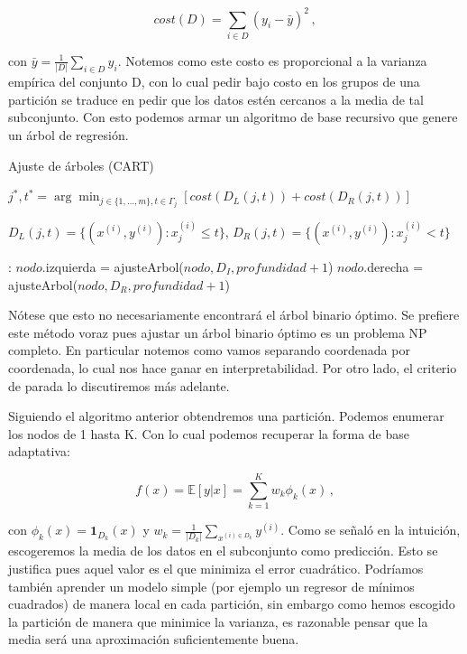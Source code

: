 \begin{equation}
    cost(D) = \sum_{i \in D} (y_i - \bar y)^2 \,,
\end{equation}

con $\bar y = \frac{1}{|D|} \sum_{i \in D} y_i $. Notemos como este costo es proporcional a la varianza empírica del conjunto D, con lo cual pedir bajo costo en los grupos de una partición se traduce en pedir que los datos estén cercanos a la media de tal subconjunto. Con esto podemos armar un algoritmo de base recursivo que genere un árbol de regresión.


\begin{algorithm}[H]
  \caption{Ajuste de árboles (CART)
    \label{alg:CART}}
  \begin{algorithmic}[1]
      \State $j^*, t^* = \arg\min_{j \in \{1,\dots,m\}, t \in \Gamma_j} \left[ cost(D_L(j,t)) + cost(D_R(j,t)) \right]$

        $D_L(j,t) = \{(x^{(i)}, y^{(i)}) : x_j^{(i)} \leq t \}$, $D_R(j,t) = \{(x^{(i)}, y^{(i)}) : x_j^{(i)} < t \}$
      
      :
      \Else
        \State $nodo$.izquierda = ajusteArbol($nodo, D_I, profundidad + 1$)
        \State $nodo$.derecha = ajusteArbol($nodo, D_R, profundidad + 1$)
    \EndFunction
  \end{algorithmic}
\end{algorithm}

Nótese que esto no necesariamente encontrará el árbol binario óptimo. Se prefiere este método voraz pues ajustar un árbol binario óptimo es un problema NP completo. En particular notemos como vamos separando coordenada por coordenada, lo cual nos hace ganar en interpretabilidad. Por otro lado, el 
 criterio de parada lo discutiremos más adelante.

Siguiendo el algoritmo anterior obtendremos una partición. Podemos enumerar los nodos de 1 hasta K. Con lo cual podemos recuperar la forma de base adaptativa:

\begin{equation}
    f(x) = \mathbb{E}[y | x] = \sum^K_{k=1} w_k \phi_k(x) \,,
\end{equation}

con $\phi_k(x) = \mathbf{1}_{D_k}(x)$ y $w_k = \frac{1}{|D_k|} \sum_{x^{(i) \in D_k}} y^{(i)}$. Como se señaló en la intuición, escogeremos la media de los datos en el subconjunto como predicción. Esto se justifica pues aquel valor es el que minimiza el error cuadrático. Podríamos también aprender un modelo simple (por ejemplo un regresor de mínimos cuadrados) de manera local en cada partición, sin embargo como hemos escogido la partición de manera que minimice la varianza, es razonable pensar que la media será una aproximación suficientemente buena.


